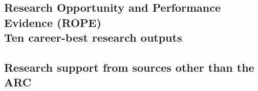 \documentclass[14pt,a4paper]{scrartcl}
\begin{document}
\subsection{Research Opportunity and Performance Evidence (ROPE)\\
  Ten career-best research outputs}
\label{sec:ten-best-outputs}



\setcounter{section}{7} %
\setcounter{subsection}{0}
\subsection{Research support from sources other than the ARC}
\label{sec:other-research-support}



\printbibliography[title=References]
\end{document}
